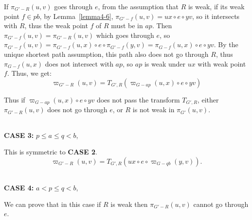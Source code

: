 \documentclass[11pt]{article}
\theoremstyle{plain}
\theoremstyle{definition}
\newcommand{\og}[3]{\pi_{G-#3}\left(#1,#2\right)}
\newcommand{\nng}[3]{\pi_{G'-#3}\left(#1,#2\right)}
\newcommand{\odg}[3]{\varpi_{G-#3}\left(#1,#2\right)}
\newcommand{\ndg}[3]{\varpi_{G'-#3}\left(#1,#2\right)}
\newcommand{\pp}[1]{T_{G',R}\left(#1\right)}
\begin{document}
\begin{center}
 \end{center}

If $\nng{u}{v}{R}$ goes through $e$, from the assumption that $R$ is weak, if its weak point $f\in pb$, by Lemma~\ref{lemma4-6}, $\nng{u}{v}{f}=ux\circ e\circ yv$, so it intersects with $R$, thus the weak point $f$ of $R$ must be in $ap$. Then $\nng{u}{v}{f}=\nng{u}{v}{R}$ which goes through $e$, so $\nng{u}{v}{f}=\nng{u}{x}{f}\circ e\circ \nng{y}{v}{f}=\og{u}{x}{f}\circ e\circ yv$. 
By the unique shortest path assumption, this path also does not go through $R$, thus $\og{u}{x}{f}$ does not intersect with $ap$, so $ap$ is weak under $ux$ with weak point $f$. Thus, we get:
$$\ndg{u}{v}{R}=\pp{\odg{u}{x}{ap}\circ e\circ yv}$$

Thus if $\odg{u}{x}{ap}\circ e\circ yv$ does not pass the transform $T_{G',R}$, either $\nng{u}{v}{R}$ does not go through $e$, or $R$ is not weak in $\pi_{G'}(u,v)$.



~\\
\noindent\textbf{CASE 3:} $p\le a\le q< b$,

This is symmetric to \textbf{CASE 2}. $$\ndg{u}{v}{R}=\pp{ux\circ e\circ \odg{y}{v}{qb}}.$$

~\\
\noindent\textbf{CASE 4:} $a<p\le q<b$,

We can prove that in this case if $R$ is weak then $\nng{u}{v}{R}$ cannot go through $e$. 
\end{document}
